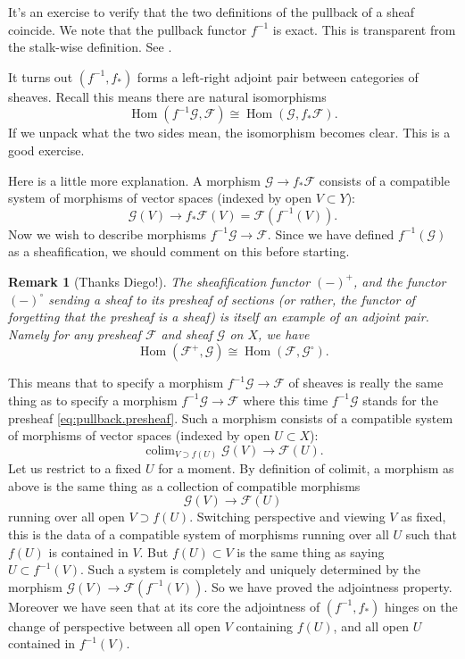 \documentclass[12pt]{article}
\theoremstyle{plain}
\newtheorem{rem}[thm]{Remark}
\newtheorem{exer}[thm]{Exercise}
\theoremstyle{definition}
\numberwithin{equation}{section}
\DeclareMathOperator*{\colim}{colim}
\DeclareMathOperator{\Hom}{Hom}
\newcommand{\CF}{\mathcal{F}}
\newcommand{\CG}{\mathcal{G}}
\begin{document}
It's an exercise to verify that the two definitions of the pullback of a sheaf coincide. We note that the pullback functor $f^{-1}$ is exact. This is transparent from the stalk-wise definition. See {\cite[Lemma 17.3.3(c)]{stacks-project}}.


It turns out $(f^{-1}, f_*)$ forms a left-right adjoint pair between categories of sheaves. Recall this means there are natural isomorphisms
\[
\Hom(f^{-1}\CG, \CF) \cong \Hom(\CG, f_*\CF).
\]
If we unpack what the two sides mean, the isomorphism becomes clear. This is a good exercise.
%

Here is a little more explanation. A morphism $\CG \rightarrow f_* \CF$ consists of a compatible system of morphisms of vector spaces (indexed by open $V \subset Y$):
\[
\CG(V) \rightarrow f_*\CF(V) = \CF(f^{-1}(V)).
\]
Now we wish to describe morphisms $f^{-1}\CG \rightarrow \CF$. Since we have defined $f^{-1}(\CG)$ as a sheafification, we should comment on this before starting.
\begin{rem}[Thanks Diego!]
The sheafification functor $(-)^+$, and the functor $(-)^{\circ}$ sending a sheaf to its presheaf of sections (or rather, the functor of forgetting that the presheaf is a sheaf) is itself an example of an adjoint pair. Namely for any presheaf $\CF$ and sheaf $\CG$ on $X$, we have
\[
\Hom(\CF^+, \CG) \cong \Hom(\CF, \CG^{\circ}).
\]
\end{rem}
This means that to specify a morphism $f^{-1}\CG \rightarrow \CF$ of sheaves is really the same thing as to specify a morphism $f^{-1}\CG \rightarrow \CF$ where this time $f^{-1}\CG$ stands for the presheaf \eqref{eq:pullback.presheaf}. Such a morphism consists of a compatible system of morphisms of vector spaces (indexed by open $U \subset X$):
\[
\colim_{V \supset f(U)} \CG(V) \rightarrow \CF(U).
\]
Let us restrict to a fixed $U$ for a moment. By definition of colimit, a morphism as above is the same thing as a collection of compatible morphisms
\[
\CG(V) \rightarrow \CF(U)
\]
running over all open $V \supset f(U)$. Switching perspective and viewing $V$ as fixed, this is the data of a compatible system of morphisms running over all $U$ such that $f(U)$ is contained in $V$. But $f(U) \subset V$ is the same thing as saying $U \subset f^{-1}(V)$. Such a system is completely and uniquely determined by the morphism $\CG(V) \rightarrow \CF(f^{-1}(V))$. So we have proved the adjointness property. Moreover we have seen that at its core the adjointness of $(f^{-1}, f_*)$ hinges on the change of perspective between all open $V$ containing $f(U)$, and all open $U$ contained in $f^{-1}(V)$.
\end{document}
